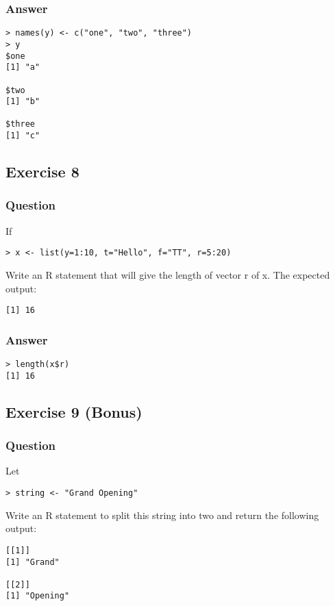 \documentclass[11pt]{article}
\begin{document}
\subsubsection{Answer}
\label{sec:orgcbfd405}
\begin{verbatim}
> names(y) <- c("one", "two", "three")
> y
$one
[1] "a"

$two
[1] "b"

$three
[1] "c"
\end{verbatim}

\subsection{Exercise 8}
\label{sec:orgb25cfd2}
\subsubsection{Question}
\label{sec:orgb34a74e}
If
\begin{verbatim}
> x <- list(y=1:10, t="Hello", f="TT", r=5:20)
\end{verbatim}

Write an R statement that will give the length of vector r of x.  The expected output:
\begin{verbatim}
[1] 16
\end{verbatim}

\subsubsection{Answer}
\label{sec:org3305e38}
\begin{verbatim}
> length(x$r)
[1] 16
\end{verbatim}

\subsection{Exercise 9 (Bonus)}
\label{sec:orgdae3e84}
\subsubsection{Question}
\label{sec:org53a749c}
Let
\begin{verbatim}
> string <- "Grand Opening"
\end{verbatim}

Write an R statement to split this string into two and return the following output:
\begin{verbatim}
[[1]]
[1] "Grand"

[[2]]
[1] "Opening"
\end{verbatim}
\end{document}
